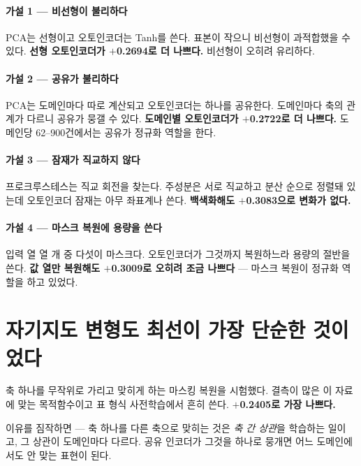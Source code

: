 \documentclass[10pt]{article}
\begin{document}
\paragraph{가설 1 --- 비선형이 불리하다}
PCA는 선형이고 오토인코더는 Tanh를 쓴다. 표본이 작으니 비선형이 과적합했을
수 있다. \textbf{선형 오토인코더가 $+$0.2694로 더 나쁘다.} 비선형이 오히려
유리하다.

\paragraph{가설 2 --- 공유가 불리하다}
PCA는 도메인마다 따로 계산되고 오토인코더는 하나를 공유한다. 도메인마다 축의
관계가 다르니 공유가 뭉갤 수 있다. \textbf{도메인별 오토인코더가 $+$0.2722로 더
나쁘다.} 도메인당 62--900건에서는 공유가 정규화 역할을 한다.

\paragraph{가설 3 --- 잠재가 직교하지 않다}
프로크루스테스는 직교 회전을 찾는다. 주성분은 서로 직교하고 분산 순으로
정렬돼 있는데 오토인코더 잠재는 아무 좌표계나 쓴다. \textbf{백색화해도
$+$0.3083으로 변화가 없다.}

\paragraph{가설 4 --- 마스크 복원에 용량을 쓴다}
입력 열 열 개 중 다섯이 마스크다. 오토인코더가 그것까지 복원하느라 용량의
절반을 쓴다. \textbf{값 열만 복원해도 $+$0.3009로 오히려 조금 나쁘다} ---
마스크 복원이 정규화 역할을 하고 있었다.


\section{자기지도 변형도 최선이 가장 단순한 것이었다}

축 하나를 무작위로 가리고 맞히게 하는 마스킹 복원을 시험했다. 결측이 많은
이 자료에 맞는 목적함수이고 표 형식 사전학습에서 흔히 쓴다. \textbf{$+$0.2405로
가장 나쁘다.}

이유를 짐작하면 --- 축 하나를 다른 축으로 맞히는 것은 \emph{축 간 상관}을
학습하는 일이고, 그 상관이 도메인마다 다르다. 공유 인코더가 그것을 하나로
뭉개면 어느 도메인에서도 안 맞는 표현이 된다.
\end{document}
